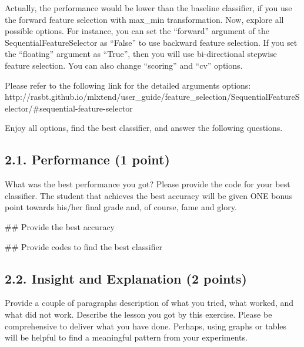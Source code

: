\documentclass[
  letterpaper,
]{scrbook}
\newenvironment{Shaded}{\begin{snugshade}}{\end{snugshade}}
\newcommand{\CommentTok}[1]{\textcolor[rgb]{0.37,0.37,0.37}{#1}}
\begin{document}
Actually, the performance would be lower than the baseline classifier,
if you use the forward feature selection with max\_min transformation.
Now, explore all possible options. For instance, you can set the
``forward'' argument of the SequentialFeatureSelector as ``False'' to
use backward feature selection. If you set the ``floating'' argument as
``True'', then you will use bi-directional stepwise feature selection.
You can also change ``scoring'' and ``cv'' options.

Please refer to the following link for the detailed arguments options:
http://rasbt.github.io/mlxtend/user\_guide/feature\_selection/SequentialFeatureSelector/\#sequential-feature-selector

Enjoy all options, find the best classifier, and answer the following
questions.

\subsection*{2.1. Performance (1 point)}\label{performance-1-point}

What was the best performance you got? Please provide the code for your
best classifier. The student that achieves the best accuracy will be
given ONE bonus point towards his/her final grade and, of course, fame
and glory.

\begin{Shaded}
\begin{Highlighting}[]
\CommentTok{\#\# Provide the best accuracy}
\end{Highlighting}
\end{Shaded}

\begin{Shaded}
\begin{Highlighting}[]
\CommentTok{\#\# Provide codes to find the best classifier}
\end{Highlighting}
\end{Shaded}

\subsection*{2.2. Insight and Explanation (2
points)}\label{insight-and-explanation-2-points}

Provide a couple of paragraphs description of what you tried, what
worked, and what did not work. Describe the lesson you got by this
exercise. Please be comprehensive to deliver what you have done.
Perhaps, using graphs or tables will be helpful to find a meaningful
pattern from your experiments.
\end{document}
